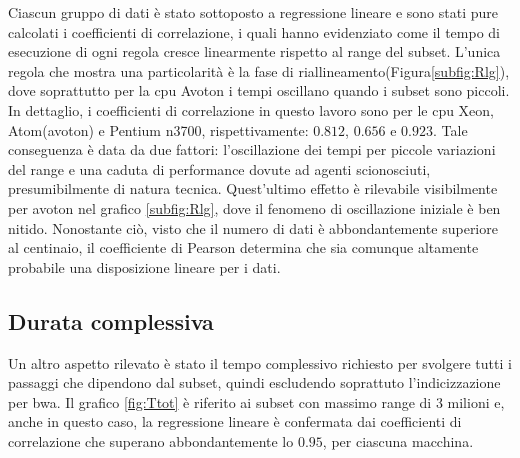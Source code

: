 Ciascun gruppo di dati è stato sottoposto a regressione lineare e sono stati pure calcolati i coefficienti di correlazione, i quali hanno evidenziato come il tempo di esecuzione di ogni regola cresce linearmente rispetto al range del subset.
L'unica regola che mostra una particolarità è la fase di riallineamento(Figura\ref{subfig:Rlg}), dove soprattutto per la cpu Avoton i tempi oscillano quando i subset sono piccoli. 
In dettaglio, i coefficienti di correlazione in questo lavoro sono per le cpu Xeon, Atom(avoton) e Pentium n3700, rispettivamente: $0.812$, $0.656$ e $0.923$. 
Tale conseguenza è data da due fattori: l'oscillazione dei tempi per piccole variazioni del range e una caduta di performance dovute ad agenti scionosciuti, presumibilmente di natura tecnica.
Quest'ultimo effetto è rilevabile visibilmente per avoton nel grafico \ref{subfig:Rlg}, dove il fenomeno di oscillazione iniziale è ben nitido.
Nonostante ciò, visto che il numero di dati è abbondantemente superiore al centinaio, il coefficiente di Pearson determina che sia comunque altamente probabile una disposizione lineare per i dati.





\subsection{Durata complessiva}
Un altro aspetto rilevato è stato il tempo complessivo richiesto per svolgere tutti i passaggi che dipendono dal subset, quindi escludendo soprattuto l'indicizzazione per bwa.
Il grafico \ref{fig:Ttot} è riferito ai subset con massimo range di 3 milioni e, anche in questo caso, la regressione lineare è confermata dai coefficienti di correlazione che superano abbondantemente lo $0.95$, per ciascuna macchina.

